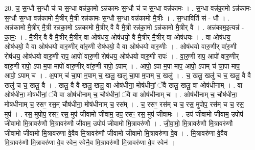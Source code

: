 \documentclass[17pt]{extarticle}
\begin{document}
20. च॒ स॒न्धौ स॒न्धौ च॑ च स॒न्धा वन्न॑का॒मो ऽन्न॑कामः स॒न्धौ च॑ च स॒न्धा वन्न॑कामः । . स॒न्धा वन्न॑का॒मो ऽन्न॑कामः स॒न्धौ स॒न्धा वन्न॑कामो मै॒त्रीर् मै॒त्री रन्न॑कामः स॒न्धौ स॒न्धा वन्न॑कामो मै॒त्रीः । . स॒न्धाविति॑ सं - धौ । . अन्न॑कामो मै॒त्रीर् मै॒त्री रन्न॑का॒मो ऽन्न॑कामो मै॒त्रीर् वै वै मै॒त्री रन्न॑का॒मो ऽन्न॑कामो मै॒त्रीर् वै । . अन्न॑काम॒इत्यन्न॑ - का॒मः॒ । . मै॒त्रीर् वै वै मै॒त्रीर् मै॒त्रीर् वा ओष॑धय॒ ओष॑धयो॒ वै मै॒त्रीर् मै॒त्रीर् वा ओष॑धयः । . वा ओष॑धय॒ ओष॑धयो॒ वै वा ओष॑धयो वारु॒णीर् वा॑रु॒णी रोष॑धयो॒ वै वा ओष॑धयो वारु॒णीः । . ओष॑धयो वारु॒णीर् वा॑रु॒णी रोष॑धय॒ ओष॑धयो वारु॒णी राप॒ आपो॑ वारु॒णी रोष॑धय॒ ओष॑धयो वारु॒णी रापः॑ । . वा॒रु॒णी राप॒ आपो॑ वारु॒णीर् वा॑रु॒णी रापो॒ ऽपा म॒पा मापो॑ वारु॒णीर् वा॑रु॒णी रापो॒ ऽपाम् । . आपो॒ ऽपा म॒पा माप॒ आपो॒ ऽपाम् च॑ चा॒पा माप॒ आपो॒ ऽपाम् च॑ । . अ॒पाम् च॑ चा॒पा म॒पाम् च॒ खलु॒ खलु॑ चा॒पा म॒पाम् च॒ खलु॑ । . च॒ खलु॒ खलु॑ च च॒ खलु॒ वै वै खलु॑ च च॒ खलु॒ वै । . खलु॒ वै वै खलु॒ खलु॒ वा ओष॑धीना॒ मोष॑धीनां॒ ॅवै खलु॒ खलु॒ वा ओष॑धीनाम् । . वा ओष॑धीना॒ मोष॑धीनां॒ ॅवै वा ओष॑धीनाम् च॒ चौष॑धीनां॒ ॅवै वा ओष॑धीनाम् च । . ओष॑धीनाम् च॒ चौष॑धीना॒ मोष॑धीनाम् च॒ रसꣳ॒॒ रस॒म् चौष॑धीना॒ मोष॑धीनाम् च॒ रस᳚म् । . च॒ रसꣳ॒॒ रस॑म् च च॒ रस॒ मुपोप॒ रस॑म् च च॒ रस॒ मुप॑ । . रस॒ मुपोप॒ रसꣳ॒॒ रस॒ मुप॑ जीवामो जीवाम॒ उप॒ रसꣳ॒॒ रस॒ मुप॑ जीवामः । . उप॑ जीवामो जीवाम॒ उपोप॑ जीवामो मि॒त्रावरु॑णौ मि॒त्रावरु॑णौ जीवाम॒ उपोप॑ जीवामो मि॒त्रावरु॑णौ । . जी॒वा॒मो॒ मि॒त्रावरु॑णौ मि॒त्रावरु॑णौ जीवामो जीवामो मि॒त्रावरु॑णा वे॒वैव मि॒त्रावरु॑णौ जीवामो जीवामो मि॒त्रावरु॑णा वे॒व । . मि॒त्रावरु॑णा वे॒वैव मि॒त्रावरु॑णौ मि॒त्रावरु॑णा वे॒व स्वेन॒ स्वेनै॒व मि॒त्रावरु॑णौ मि॒त्रावरु॑णा वे॒व स्वेन॑ । \newline
\end{document}
